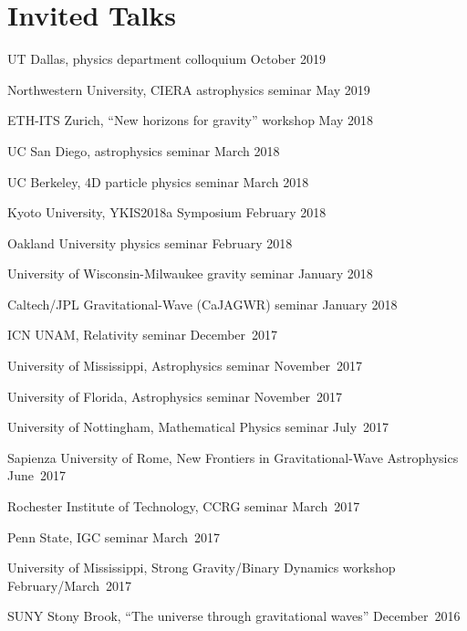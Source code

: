 \newcommand{\playsymbol}{$\blacktriangleright$}
\section{\sc Invited Talks}
\begin{etaremune}
\item
  UT Dallas, physics department colloquium
  \hfill{}
  October 2019
\item
  Northwestern University, CIERA astrophysics seminar
  \hfill{}
  May 2019
\item
  ETH-ITS Zurich, ``New horizons for gravity'' workshop
  \hfill{}
  May 2018
\item
  UC San Diego, astrophysics seminar
  \hfill{}
  March 2018
\item
  UC Berkeley, 4D particle physics seminar
  \hfill{}
  March 2018
\item
  Kyoto University, YKIS2018a Symposium
  \hfill{}
  February 2018
\item
  Oakland University physics seminar
  \hfill{}
  February 2018
\item
  University of Wisconsin-Milwaukee gravity seminar
  \hfill{}
  January 2018
\item
  Caltech/JPL Gravitational-Wave (CaJAGWR) seminar
  \hfill{}
  January 2018
\item
  ICN UNAM,
  Relativity seminar
  \hfill{}
  December~2017
\item
  University of Mississippi,
  Astrophysics seminar
  \hfill{}
  November~2017
\item
  University of Florida,
  Astrophysics seminar
  \hfill{}
  November~2017
\item
  University of Nottingham,
  Mathematical Physics seminar
  \hfill{}
  July~2017
\item
  Sapienza University of Rome,
  New Frontiers in Gravitational-Wave Astrophysics
  \hfill{}
  June~2017
\item
  Rochester Institute of Technology,
  CCRG seminar
  \hfill{}
  March~2017
\item
  Penn State,
  IGC seminar
  \hfill{}
  March~2017
\item
  University of Mississippi,
  Strong Gravity/Binary Dynamics workshop
  \hfill{}
  February/March~2017
\item
  SUNY Stony Brook,
  ``The universe through gravitational waves''
  \hfill{}
  December~2016
\item

\end{etaremune}
